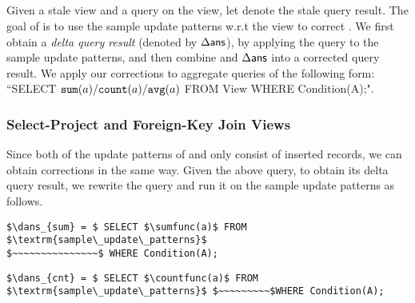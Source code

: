 \subsection{\Cqp}\label{subsec:correct-principle}
Given a stale view and a query on the view, let \ans denote the stale query result. The goal of \cqp is to use the sample update patterns w.r.t the view to correct \ans. We first obtain a \emph{delta query result} (denoted by $\Delta\textsf{ans}$), by applying the query to the sample update patterns, and then combine \ans and $\Delta\textsf{ans}$ into a corrected query result. We apply our corrections to aggregate queries of the following form: ``SELECT $\texttt{sum} (a)/\texttt{count}(a)/\texttt{avg} (a)$ FROM View WHERE Condition(A);".








\subsubsection{Select-Project and Foreign-Key Join Views} \label{subsubsec:correct-spfj}
Since both of the update patterns of \spview and \fjview only consist of inserted records, we can obtain corrections in the same way. Given the above query, to obtain its delta query result, we rewrite the query and run it on the sample update patterns as follows.  

\vspace{-.25em}

\begin{lstlisting}[mathescape,basicstyle={\scriptsize}]
$\dans_{sum} = $ SELECT $\sumfunc(a)$ FROM $\textrm{sample\_update\_patterns}$ 
$~~~~~~~~~~~~~~~$ WHERE Condition(A);
\end{lstlisting}

\vspace{-.25em}

\begin{lstlisting}[mathescape,basicstyle={\scriptsize}]
$\dans_{cnt} = $ SELECT $\countfunc(a)$ FROM $\textrm{sample\_update\_patterns}$ $~~~~~~~~~$WHERE Condition(A);
\end{lstlisting}

